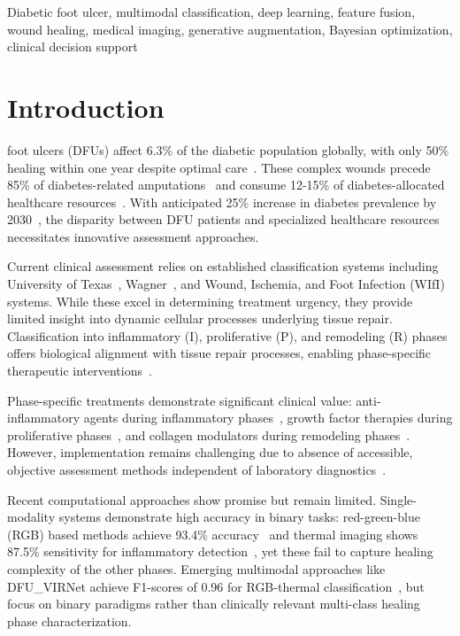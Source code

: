 \documentclass[journal,twoside,web]{ieeecolor}
\begin{document}
\begin{IEEEkeywords}
Diabetic foot ulcer, multimodal classification, deep learning, feature fusion, wound healing, medical imaging, generative augmentation, Bayesian optimization, clinical decision support
\end{IEEEkeywords}

\section{Introduction}
 foot ulcers (DFUs) affect 6.3\% of the diabetic population globally, with only 50\% healing within one year despite optimal care~\cite{zhang2017global,ilonzo2018managing}. These complex wounds precede 85\% of diabetes-related amputations~\cite{bakker20052005} and consume 12-15\% of diabetes-allocated healthcare resources~\cite{venkat2005diabetes}. With anticipated 25\% increase in diabetes prevalence by 2030~\cite{saeedi2019global}, the disparity between DFU patients and specialized healthcare resources necessitates innovative assessment approaches.

Current clinical assessment relies on established classification systems including University of Texas~\cite{armstrong1998validation}, Wagner~\cite{wagner1981dysvascular}, and Wound, Ischemia, and Foot Infection (WIfI)~\cite{mills2014society} systems. While these excel in determining treatment urgency, they provide limited insight into dynamic cellular processes underlying tissue repair. Classification into inflammatory (I), proliferative (P), and remodeling (R) phases offers biological alignment with tissue repair processes, enabling phase-specific therapeutic interventions~\cite{rodrigues2019wound}.

Phase-specific treatments demonstrate significant clinical value: anti-inflammatory agents during inflammatory phases~\cite{lobmann2005proteases,sharifiaghdam2022macrophages}, growth factor therapies during proliferative phases~\cite{bennett2003growth,chakraborty2022evolving}, and collagen modulators during remodeling phases~\cite{holmes2013collagen}. However, implementation remains challenging due to absence of accessible, objective assessment methods independent of laboratory diagnostics~\cite{schmidt2022diabetic,nanda2022machine}.

Recent computational approaches show promise but remain limited. Single-modality systems demonstrate high accuracy in binary tasks: red-green-blue (RGB) based methods achieve 93.4\% accuracy~\cite{goyal2020dfunet} and thermal imaging shows 87.5\% sensitivity for inflammatory detection~\cite{cruz2020deep}, yet these fail to capture healing complexity of the other phases. Emerging multimodal approaches like DFU\_VIRNet achieve F1-scores of 0.96 for RGB-thermal classification~\cite{reyes2023dfu}, but focus on binary paradigms rather than clinically relevant multi-class healing phase characterization.
\end{document}
